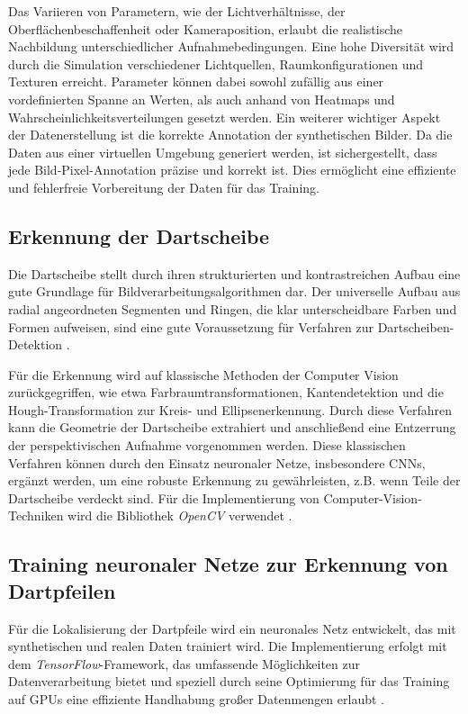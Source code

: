 Das Variieren von Parametern, wie der Lichtverhältnisse, der Oberflächenbeschaffenheit oder Kameraposition, erlaubt die realistische Nachbildung unterschiedlicher Aufnahmebedingungen. Eine hohe Diversität wird durch die Simulation verschiedener Lichtquellen, Raumkonfigurationen und Texturen erreicht. Parameter können dabei sowohl zufällig aus einer vordefinierten Spanne an Werten, als auch anhand von Heatmaps und Wahrscheinlichkeitsverteilungen gesetzt werden. Ein weiterer wichtiger Aspekt der Datenerstellung ist die korrekte Annotation der synthetischen Bilder. Da die Daten aus einer virtuellen Umgebung generiert werden, ist sichergestellt, dass jede Bild-Pixel-Annotation präzise und korrekt ist. Dies ermöglicht eine effiziente und fehlerfreie Vorbereitung der Daten für das Training.

\subsection{Erkennung der Dartscheibe}
\label{sec:implementierung:dartscheibe}

Die Dartscheibe stellt durch ihren strukturierten und kontrastreichen Aufbau eine gute Grundlage für Bildverarbeitungsalgorithmen dar. Der universelle Aufbau aus radial angeordneten Segmenten und Ringen, die klar unterscheidbare Farben und Formen aufweisen, sind eine gute Voraussetzung für Verfahren zur Dartscheiben-Detektion \cite{dra-darts-rules, wdf-darts-rules}.

Für die Erkennung wird auf klassische Methoden der Computer Vision zurückgegriffen, wie etwa Farbraumtransformationen, Kantendetektion und die Hough-Transformation zur Kreis- und Ellipsenerkennung. Durch diese Verfahren kann die Geometrie der Dartscheibe extrahiert und anschließend eine Entzerrung der perspektivischen Aufnahme vorgenommen werden. Diese klassischen Verfahren können durch den Einsatz neuronaler Netze, insbesondere CNNs, ergänzt werden, um eine robuste Erkennung zu gewährleisten, z.B. wenn Teile der Dartscheibe verdeckt sind. Für die Implementierung von Computer-Vision-Techniken wird die Bibliothek \textit{OpenCV} verwendet \cite{opencv}.

\subsection{Training neuronaler Netze zur Erkennung von Dartpfeilen}
\label{sec:implementierung:ki}

Für die Lokalisierung der Dartpfeile wird ein neuronales Netz entwickelt, das mit synthetischen und realen Daten trainiert wird. Die Implementierung erfolgt mit dem \textit{TensorFlow}-Framework, das umfassende Möglichkeiten zur Datenverarbeitung bietet und speziell durch seine Optimierung für das Training auf GPUs eine effiziente Handhabung großer Datenmengen erlaubt \cite{tensorflow}.

